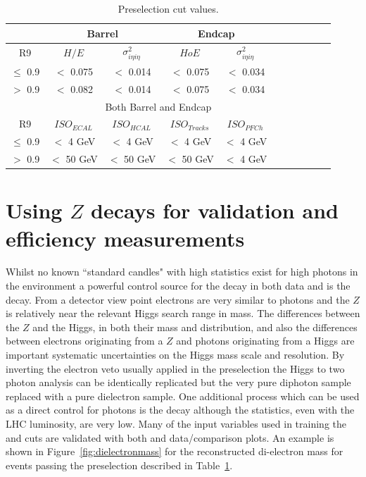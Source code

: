 \begin{table}
\noindent
  \begin{center}
  \caption{Preselection cut values.}
    \begin{tabular}{c c c c c c c c c c c }
                & \multicolumn{2}{c}{Barrel} & \multicolumn{2}{c}{Endcap} \\ 
      \hline
      R9        & $H/E$ & $\sigma^{2}_{i\eta i\eta}$ & $HoE$ & $\sigma^{2}_{i\eta i\eta}$  \\ 
      $\le$ 0.9 & $<$ 0.075 & $<$ 0.014 & $<$ 0.075 & $<$ 0.034 \\
      $>$ 0.9   & $<$ 0.082 & $<$ 0.014 & $<$ 0.075 & $<$ 0.034  \\ 
      \hline    
                & \multicolumn{4}{c}{Both Barrel and Endcap}\\ 
      \hline
      R9        & $ISO_{ECAL}$ & $ISO_{HCAL}$ &  $ISO_{Tracks}$ & $ISO_{PFCh}$ \\ 
      $\le$ 0.9 &$<$ 4 GeV & $<$ 4 GeV & $<$ 4 GeV & $<$ 4 GeV\\ 
      $>$ 0.9   &$<$ 50 GeV & $<$ 50 GeV & $<$ 50 GeV & $<$ 4 GeV\\ 
    \end{tabular}
  \label{table:preselection}
  \end{center}
\end{table}

\section{Using $Z$ decays for validation and efficiency measurements}
\label{sec:zee}

Whilst no known ``standard candles" with high statistics exist for high \pT photons in the \LHC environment a powerful control source for the \Hgg decay in both data and \MC is the \Zee decay. From a detector view point electrons are very similar to photons and the $Z$ is relatively near the relevant Higgs search range in mass. The differences between the $Z$ and the Higgs, in both their mass and \pT distribution, and also the differences between electrons originating from a $Z$ and photons originating from a Higgs are important systematic uncertainties on the Higgs mass scale and resolution. By inverting the electron veto usually applied in the preselection the Higgs to two photon analysis can be identically replicated but the very pure diphoton sample replaced with a pure dielectron sample. One additional process which can be used as a direct control for photons is the \Zmumugamma decay although the statistics, even with the LHC luminosity, are very low. Many of the input variables used in training the \BDTs and cuts are validated with both \Zee and \Zmumugamma data/\MC comparison plots. An example is shown in Figure~\ref{fig:dielectronmass} for the reconstructed di-electron mass for events passing the preselection described in Table~\ref{table:preselection}.

